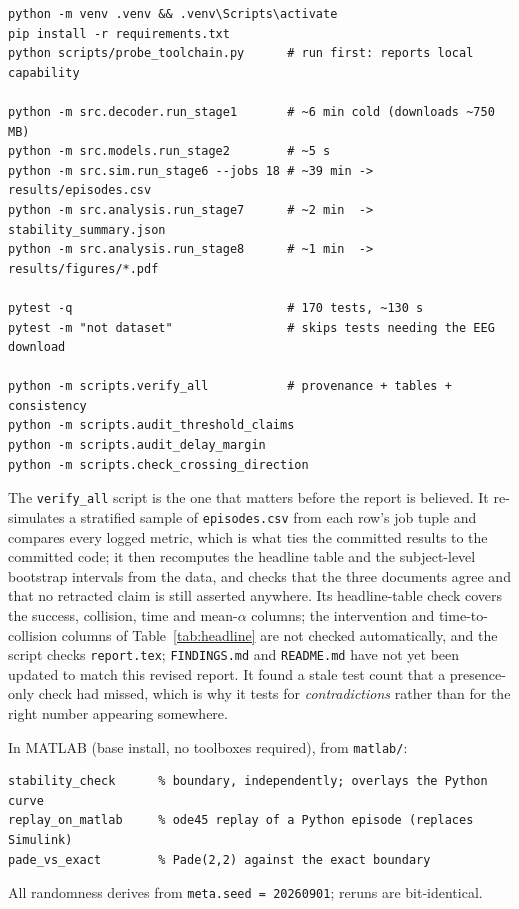 \documentclass[11pt,a4paper]{article}
\theoremstyle{plain}
\theoremstyle{definition}
\begin{document}
\begin{verbatim}
python -m venv .venv && .venv\Scripts\activate
pip install -r requirements.txt
python scripts/probe_toolchain.py      # run first: reports local capability

python -m src.decoder.run_stage1       # ~6 min cold (downloads ~750 MB)
python -m src.models.run_stage2        # ~5 s
python -m src.sim.run_stage6 --jobs 18 # ~39 min -> results/episodes.csv
python -m src.analysis.run_stage7      # ~2 min  -> stability_summary.json
python -m src.analysis.run_stage8      # ~1 min  -> results/figures/*.pdf

pytest -q                              # 170 tests, ~130 s
pytest -m "not dataset"                # skips tests needing the EEG download

python -m scripts.verify_all           # provenance + tables + consistency
python -m scripts.audit_threshold_claims
python -m scripts.audit_delay_margin
python -m scripts.check_crossing_direction
\end{verbatim}

The \texttt{verify\_all} script is the one that matters before the report is
believed. It re-simulates a stratified sample of \texttt{episodes.csv} from
each row's job tuple and compares every logged metric, which is what ties the
committed results to the committed code; it then recomputes the headline table
and the subject-level bootstrap intervals from the data, and checks that the
three documents agree and that no retracted claim is still asserted anywhere.
Its headline-table check covers the success, collision, time and mean-$\alpha$
columns; the intervention and time-to-collision columns of
Table~\ref{tab:headline} are not checked automatically, and the script
checks \texttt{report.tex}; \texttt{FINDINGS.md} and \texttt{README.md}
have not yet been updated to match this revised report.
It found a stale test count that a presence-only check had missed, which is
why it tests for \emph{contradictions} rather than for the right number
appearing somewhere.

In MATLAB (base install, no toolboxes required), from \texttt{matlab/}:

\begin{verbatim}
stability_check      % boundary, independently; overlays the Python curve
replay_on_matlab     % ode45 replay of a Python episode (replaces Simulink)
pade_vs_exact        % Pade(2,2) against the exact boundary
\end{verbatim}

All randomness derives from \texttt{meta.seed = 20260901}; reruns are
bit-identical.
\end{document}
